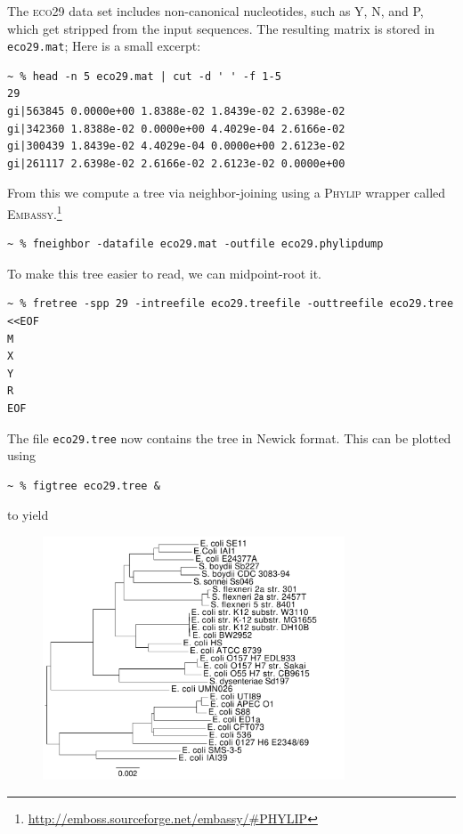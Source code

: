 \documentclass[a4paper,
  10pt,
  english,
  DIV=12,
  BCOR=8mm]{scrbook}
\newcommand{\algo}[1]{\textsc{{#1}}}
\newcommand{\word}[1]{\textsf{\small#1}}
\begin{document}
\noindent The \algo{eco29} data set includes non-canonical nucleotides, such as \word{Y}, \word{N}, and \word{P}, which get stripped from the input sequences. The resulting matrix is stored in \lstinline$eco29.mat$; Here is a small excerpt:

\begin{lstlisting}
~ % head -n 5 eco29.mat | cut -d ' ' -f 1-5
29
gi|563845 0.0000e+00 1.8388e-02 1.8439e-02 2.6398e-02
gi|342360 1.8388e-02 0.0000e+00 4.4029e-04 2.6166e-02
gi|300439 1.8439e-02 4.4029e-04 0.0000e+00 2.6123e-02
gi|261117 2.6398e-02 2.6166e-02 2.6123e-02 0.0000e+00
\end{lstlisting}

\noindent From this we compute a tree via neighbor-joining using a \algo{Phylip} wrapper called \algo{Embassy}.\footnote{\url{http://emboss.sourceforge.net/embassy/\#PHYLIP}}

\begin{lstlisting}
~ % fneighbor -datafile eco29.mat -outfile eco29.phylipdump
\end{lstlisting}
\noindent To make this tree easier to read, we can midpoint-root it.
\begin{lstlisting}
~ % fretree -spp 29 -intreefile eco29.treefile -outtreefile eco29.tree <<EOF
M
X
Y
R
EOF
\end{lstlisting}

\noindent The file \lstinline$eco29.tree$ now contains the tree in Newick format. This can be plotted using \cite{figtree}

\begin{lstlisting}
~ % figtree eco29.tree &
\end{lstlisting}

\noindent to yield

\begin{figure}[h]
  \centering\includegraphics[width=0.8\textwidth]{andi_labels.pdf}
\end{figure}
\end{document}
